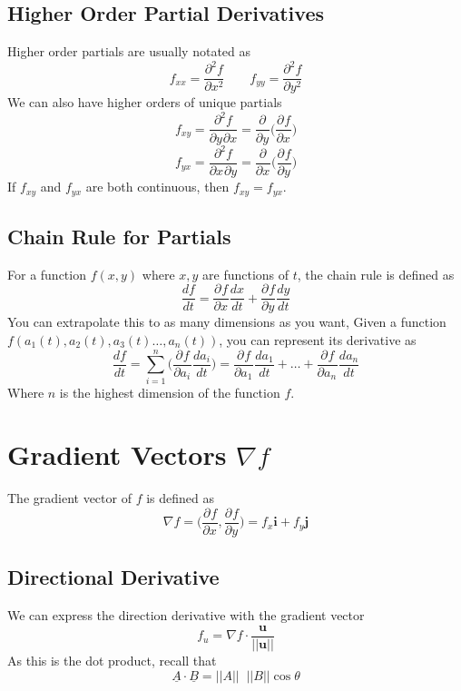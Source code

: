 \documentclass{article}
\theoremstyle{remark}
\theoremstyle{definition}
\begin{document}
\begin{landscape}
\begin{multicols*}{3}
   \subsection*{Higher Order Partial Derivatives}
   Higher order partials are usually notated as
   \[ 
     f_{xx} = \frac{\partial^{2}{f}}{\partial{x}^{2}} \qquad f_{yy}
     = \frac{\partial^{2}{f}}{\partial{y}^{2}}
   \]
   We can also have higher orders of unique partials
   \[ 
     f_{xy} = \frac{\partial^{2}{f}}{\partial{y}^{}\partial{x}}
     = \frac{\partial^{}{}}{\partial{y}^{}}\Big
   ( \frac{\partial^{}{f}}{\partial{x}^{}}\Big )
 \]
 \[
   f_{yx}
   = \frac{\partial^{2}{f}}{\partial{x}^{} \partial{y}}
   = \frac{\partial^{}{}}{\partial{x}^{}}\Big
 ( \frac{\partial^{}{f}}{\partial{y}^{}}\Big )
   \]
   If \( f_{xy} \) and \( f_{yx} \) are both continuous, then \( f_{xy}
   = f_{yx} \).
   \subsection*{Chain Rule for Partials}
   For a function \( f(x,y) \) where \( x,y \) are functions of \( t \), the
   chain rule is defined as
   \[ 
     \frac{df}{dt} = \frac{\partial^{}{f}}{\partial{x}^{}} \frac{dx}{dt}
     + \frac{\partial^{}{f}}{\partial{y}^{}} \frac{dy}{dt}
   \]
  You can extrapolate this to as many dimensions as you want, Given
  a function \( f(a_1(t), a_2(t), a_3(t) \dots , a_n(t)) \), you can represent its
  derivative as
  \[ 
    \frac{df}{dt} = \displaystyle \sum_{i=1}^{n}
    \Big( \frac{\partial^{}{f}}{\partial{a_i}^{}} \frac{da_i}{dt} \Big )
    = \frac{\partial^{}{f}}{\partial{a_1}^{}} \frac{da_1}{dt}
    + \dots
    + \frac{\partial^{}{f}}{\partial{a_n}^{}} \frac{da_n}{dt}
  \]
  Where \( n \) is the highest dimension of the function \( f \).
  \section*{Gradient Vectors \( \nabla f \)}
  The gradient vector of \( f \) is defined as
  \[ 
    \nabla f = \Big ( \frac{\partial^{}{f}}{\partial{x}^{}},
    \frac{\partial^{}{f}}{\partial{y}^{}}\Big ) = f_x \textbf{i} + f_y
    \textbf{j}
  \]
  \subsection*{Directional Derivative}
  We can express the direction derivative with the gradient vector
  \[ 
    f_u = \nabla f \cdot \frac{ \textbf{u}}{|| \textbf{u} ||}
  \]
  As this is the dot product, recall that 
  \[\underline{A} \cdot \underline{B}
  = ||A|| \;\; ||B|| \cos \theta\]

\end{multicols*}
\end{landscape}
\end{document}
